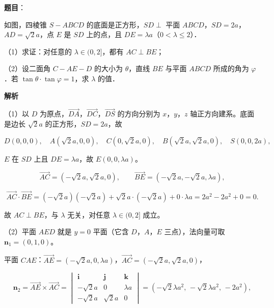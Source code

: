 \begin{answer}

\textbf{题目}：

如图，四棱锥 $S-ABCD$ 的底面是正方形，$SD\perp$ 平面 $ABCD$，$SD=2a$，$AD=\sqrt2a$，点 $E$ 是 $SD$ 上的点，且 $DE=\lambda a$（$0<\lambda\leqslant2$）．

（1）求证：对任意的 $\lambda\in(0,2]$，都有 $AC\perp BE$；

（2）设二面角 $C-AE-D$ 的大小为 $\theta$，直线 $BE$ 与平面 $ABCD$ 所成的角为 $\varphi$．若 $\tan\theta\cdot\tan\varphi=1$，求 $\lambda$ 的值．
\nopagebreak[4]
\begin{center}\end{center}
\nopagebreak[4]
\textbf{解析}

（1）以 $D$ 为原点，$\overrightarrow{DA}$，$\overrightarrow{DC}$，$\overrightarrow{DS}$ 的方向分别为 $x$，$y$，$z$ 轴正方向建系。底面是边长 $\sqrt2a$ 的正方形，$SD=2a$，故

\nopagebreak[4]
\[D(0,0,0),\quad A(\sqrt2a,0,0),\quad C(0,\sqrt2a,0),\quad B(\sqrt2a,\sqrt2a,0),\quad S(0,0,2a),\]

$E$ 在 $SD$ 上且 $DE=\lambda a$，故 $E(0,0,\lambda a)$。

\nopagebreak[4]
\[\overrightarrow{AC}=(-\sqrt2a,\sqrt2a,0),\qquad\overrightarrow{BE}=(-\sqrt2a,-\sqrt2a,\lambda a),\]

\nopagebreak[4]
\[\overrightarrow{AC}\cdot\overrightarrow{BE}=(-\sqrt2a)(-\sqrt2a)+\sqrt2a\cdot(-\sqrt2a)+0\cdot\lambda a=2a^2-2a^2+0=0.\]

故 $AC\perp BE$，与 $\lambda$ 无关，对任意 $\lambda\in(0,2]$ 成立。

（2）平面 $AED$ 就是 $y=0$ 平面（它含 $D$，$A$，$E$ 三点），法向量可取 $\boldsymbol n_1=(0,1,0)$。

平面 $CAE$：$\overrightarrow{AE}=(-\sqrt2a,0,\lambda a)$，$\overrightarrow{AC}=(-\sqrt2a,\sqrt2a,0)$，

\nopagebreak[4]
\[\boldsymbol n_2=\overrightarrow{AE}\times\overrightarrow{AC}
=\begin{vmatrix}
\boldsymbol i&\boldsymbol j&\boldsymbol k\\
-\sqrt2a&0&\lambda a\\
-\sqrt2a&\sqrt2a&0
\end{vmatrix}
=(-\sqrt2\lambda a^2,\,-\sqrt2\lambda a^2,\,-2a^2),\]


\end{answer}
